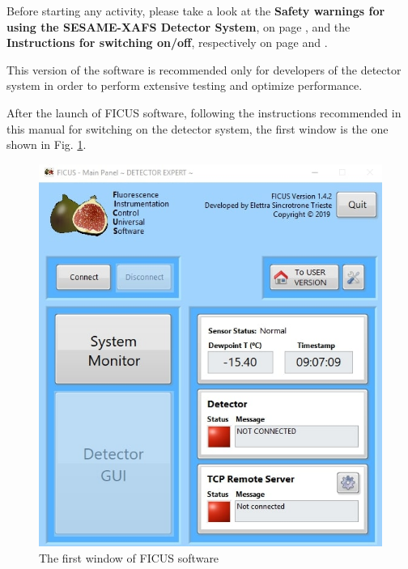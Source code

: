 \documentclass[a4paper,12pt,oneside,pdflatex,italian,final,twocolumn]{article}
\begin{document}
Before starting any activity, please take a look at the \textbf{Safety warnings for using the SESAME-XAFS Detector System}, on page \pageref{accensione}, and the \textbf{Instructions for switching on/off}, respectively on page \pageref{accensione} and \pageref{spegnimento}.

This version of the software is recommended only for developers of the detector system in order to perform extensive testing and optimize performance.

\vspace{1cm}

After the launch of FICUS software, following the instructions recommended in this manual for switching on the detector system, the first window is the one shown in Fig. \ref{fig:fig1}.

        \begin{figure}[h]
        \centering
        \includegraphics[scale=0.5]{Capture.jpg} \quad %
        \caption{The first window of FICUS software}\label{fig:fig1}
        \end{figure}
        
\end{document}
